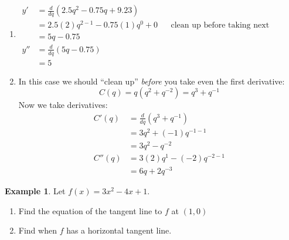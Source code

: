 \documentclass[oneside]{book}
\newcommand{\deriv}[2]{\frac{d#1}{d#2}}
\newcommand{\ddq}{\deriv {}q}
\theoremstyle{definition}
\newtheorem{example}{Example}
\theoremstyle{solution}
\newtheorem*{solution}{Solution}
\newenvironment{solution}{\vspace{2in}\comment}{\endcomment}
\begin{document}
\begin{solution}
\begin{enumerate}
\item 
\begin{align*}
 y ' & = \ddq (2.5q^2-0.75q+9.23)\\
   & = 2.5(2)q^{2-1}-0.75(1)q^{0}+0&& \text{clean up before taking next derivative}\\
  & = 5q-0.75 \\
y'' & = \ddq (5q-0.75)\\
   & = 5
\end{align*}

\item
In this case we should ``clean up'' \emph{before} you take even the first derivative:
$$
C(q) = q(q^2+q^{-2}) = q^3+q^{-1}
$$
Now we take derivatives:
\begin{align*}
C'(q) & = \ddq (q^3+q^{-1})\\
  & = 3q^2 + (-1) q^{-1-1}\\
  & = 3q^2 - q^{-2}\\
C''(q) & = 3(2)q^{1}-(-2)q^{-2-1}\\
  & = 6q+2q^{-3}
\end{align*}
\end{enumerate}
\end{solution}

\begin{example}
Let $f(x) =3x^2-4x+1$.
\begin{enumerate}
\item Find the equation of the tangent line to $f$ at $(1,0)$

\item Find when $f$ has a horizontal tangent line.
\end{enumerate}
\end{example}
\end{document}
